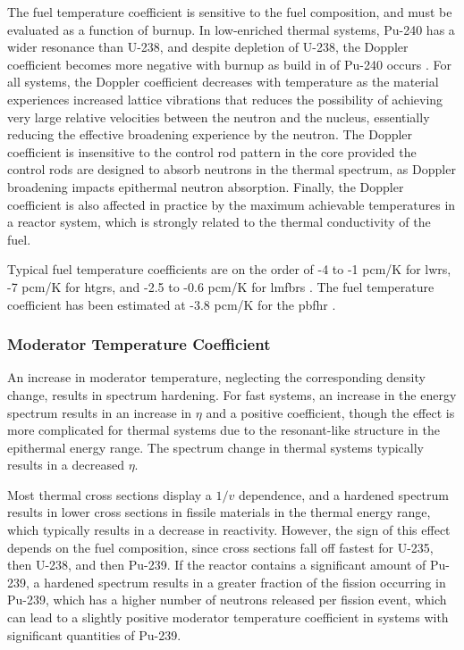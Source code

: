 
The fuel temperature coefficient is sensitive to the fuel composition, and must be evaluated as a function of burnup. In low-enriched thermal systems, Pu-240 has a wider resonance than U-238, and despite depletion of U-238, the Doppler coefficient becomes more negative with burnup as build in of Pu-240 occurs \cite{duderstadt,fratoni}. For all systems, the Doppler coefficient decreases with temperature as the material experiences increased lattice vibrations that reduces the possibility of achieving very large relative velocities between the neutron and the nucleus, essentially reducing the effective broadening experience by the neutron. The Doppler coefficient is insensitive to the control rod pattern in the core provided the control rods are designed to absorb neutrons in the thermal spectrum, as Doppler broadening impacts epithermal neutron absorption. Finally, the Doppler coefficient is also affected in practice by the maximum achievable temperatures in a reactor system, which is strongly related to the thermal conductivity of the fuel.

Typical fuel temperature coefficients are on the order of -4 to -1 pcm/K for \glspl{lwr}, -7 pcm/K for \glspl{htgr}, and -2.5 to -0.6 pcm/K for \glspl{lmfbr} \cite{duderstadt}. The fuel temperature coefficient has been estimated at -3.8 pcm/K for the \gls{pbfhr} \cite{xin_wang_thesis}.

\subsubsection{Moderator Temperature Coefficient}
An increase in moderator temperature, neglecting the corresponding density change, results in spectrum hardening. For fast systems, an increase in the energy spectrum results in an increase in \(\eta\) and a positive coefficient, though the effect is more complicated for thermal systems due to the resonant-like structure in the epithermal energy range. The spectrum change in thermal systems typically results in a decreased \(\eta\).

Most thermal cross sections display a \(1/v\) dependence, and a hardened spectrum results in lower cross sections in fissile materials in the thermal energy range, which typically results in a decrease in reactivity. However, the sign of this effect depends on the fuel composition, since cross sections fall off fastest for U-235, then U-238, and then Pu-239. If the reactor contains a significant amount of Pu-239, a hardened spectrum results in a greater fraction of the fission occurring in Pu-239, which has a higher number of neutrons released per fission event, which can lead to a slightly positive moderator temperature coefficient in systems with significant quantities of Pu-239. 

